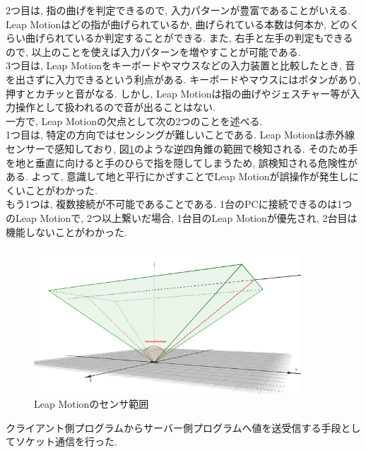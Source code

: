 \documentclass{funthesis}
\begin{document}
 
  2つ目は, 指の曲げを判定できるので, 入力パターンが豊富であることがいえる. Leap Motionはどの指が曲げられているか, 曲げられている本数は何本か, どのくらい曲げられているか判定することができる. また, 右手と左手の判定もできるので, 以上のことを使えば入力パターンを増やすことが可能である. \\
  3つ目は, Leap Motionをキーボードやマウスなどの入力装置と比較したとき, 音を出さずに入力できるという利点がある. キーボードやマウスにはボタンがあり, 押すとカチッと音がなる. しかし, Leap Motionは指の曲げやジェスチャー等が入力操作として扱われるので音が出ることはない. \\
  一方で, Leap Motionの欠点として次の2つのことを述べる.\\
  1つ目は, 特定の方向ではセンシングが難しいことである. Leap Motionは赤外線センサーで感知しており,  図\ref{leap}のような逆四角錐の範囲で検知される. そのため手を地と垂直に向けると手のひらで指を隠してしまうため, 誤検知される危険性がある. よって, 意識して地と平行にかざすことでLeap Motionが誤操作が発生しにくいことがわかった.\\
  もう1つは, 複数接続が不可能であることである. 1台のPCに接続できるのは1つのLeap Motionで, 2つ以上繋いだ場合, 1台目のLeap Motionが優先され, 2台目は機能しないことがわかった.\\
 
 \begin{figure}[H]
 \begin{center}
  \includegraphics[width=100mm]{./img/LeapAngle.png}
 \end{center}
 \caption{Leap Motionのセンサ範囲}
 \label{leap}
\end{figure}



クライアント側プログラムからサーバー側プログラムへ値を送受信する手段としてソケット通信を行った. 
\end{document}
